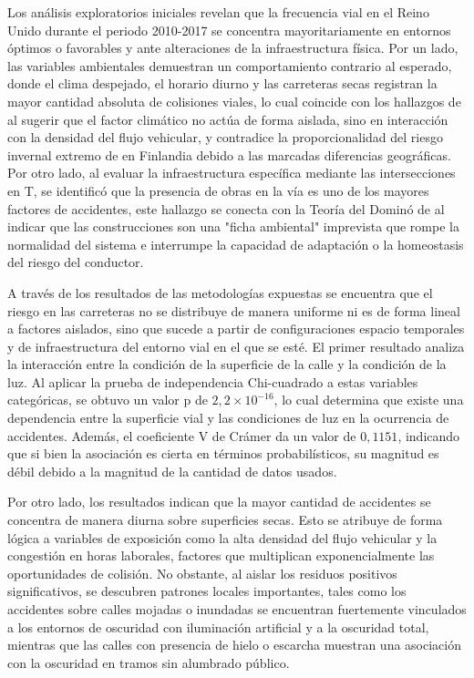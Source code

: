 \documentclass[12pt]{article}
\begin{document}
 Los análisis exploratorios iniciales revelan que la frecuencia vial en el Reino Unido durante el periodo 2010-2017 se concentra mayoritariamente en entornos óptimos o favorables y ante alteraciones de la infraestructura física. Por un lado, las variables ambientales demuestran un comportamiento contrario al esperado, donde el clima despejado, el horario diurno y las carreteras secas registran la mayor cantidad absoluta de colisiones viales, lo cual coincide con los hallazgos de \textcite{KARZAN2017} al sugerir que el factor climático no actúa de forma aislada, sino en interacción con la densidad del flujo vehicular, y contradice la proporcionalidad del riesgo invernal extremo de \textcite{MALIN2019} en Finlandia debido a las marcadas diferencias geográficas. Por otro lado, al evaluar la infraestructura específica mediante las intersecciones en T, se identificó que la presencia de obras en la vía es uno de los mayores factores de accidentes, este hallazgo se conecta con la Teoría del Dominó de \textcite{SAXENA2017} al indicar que las construcciones son una "ficha ambiental" imprevista que rompe la normalidad del sistema e interrumpe la capacidad de adaptación o la homeostasis del riesgo del conductor.

 A través de los resultados de las metodologías expuestas se encuentra que el riesgo en las carreteras no se distribuye de manera uniforme ni es de forma lineal a factores aislados, sino que sucede a partir de configuraciones espacio temporales y de infraestructura del entorno vial en el que se esté. El primer resultado analiza la interacción entre la condición de la superficie de la calle y la condición de la luz. Al aplicar la prueba de independencia Chi-cuadrado a estas variables categóricas, se obtuvo un valor p de $2,2 \times 10^{-16}$, lo cual determina que existe una dependencia entre la superficie vial y las condiciones de luz en la ocurrencia de accidentes. Además, el coeficiente V de Crámer da un valor de $0,1151$, indicando que si bien la asociación es cierta en términos probabilísticos, su magnitud es débil debido a la magnitud de la cantidad de datos usados.

 Por otro lado, los resultados indican que la mayor cantidad de accidentes se concentra de manera diurna sobre superficies secas. Esto se atribuye de forma lógica a variables de exposición como la alta densidad del flujo vehicular y la congestión en horas laborales, factores que multiplican exponencialmente las oportunidades de colisión. No obstante, al aislar los residuos positivos significativos, se descubren patrones locales importantes, tales como los accidentes sobre calles mojadas o inundadas se encuentran fuertemente vinculados a los entornos de oscuridad con iluminación artificial y a la oscuridad total, mientras que las calles con presencia de hielo o escarcha muestran una asociación con la oscuridad en tramos sin alumbrado público.
\end{document}
